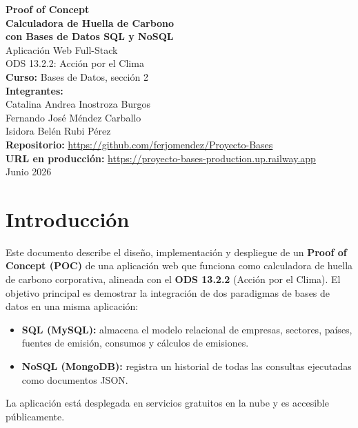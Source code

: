 \documentclass[12pt, a4paper]{article}
\begin{document}
\begin{titlepage}
\centering
\vspace*{3cm}
{\LARGE\bfseries Proof of Concept\\[0.3cm]
Calculadora de Huella de Carbono\\[0.2cm]
con Bases de Datos SQL y NoSQL}\\[1.5cm]
{\large Aplicación Web Full-Stack}\\[0.5cm]
{\large ODS 13.2.2: Acción por el Clima}\\[2.5cm]
{\large\bfseries Curso:} Bases de Datos, sección 2\\[0.6cm]
{\large\bfseries Integrantes:}\\[0.3cm]
{\large Catalina Andrea Inostroza Burgos}\\[0.15cm]
{\large Fernando José Méndez Carballo}\\[0.15cm]
{\large Isidora Belén Rubi Pérez}\\[0.6cm]
{\large\bfseries Repositorio:} \url{https://github.com/ferjomendez/Proyecto-Bases}\\[0.3cm]
{\large\bfseries URL en producción:} \url{https://proyecto-bases-production.up.railway.app}\\[2cm]
{\large Junio 2026}
\end{titlepage}
\tableofcontents
\newpage
\section{Introducción}
Este documento describe el diseño, implementación y despliegue de un \textbf{Proof of Concept (POC)} de una aplicación web que funciona como calculadora de huella de carbono corporativa, alineada con el \textbf{ODS 13.2.2} (Acción por el Clima).
El objetivo principal es demostrar la integración de dos paradigmas de bases de datos en una misma aplicación:
\begin{itemize}[nosep]
  \item \textbf{SQL (MySQL):} almacena el modelo relacional de empresas, sectores, países, fuentes de emisión, consumos y cálculos de emisiones.
  \item \textbf{NoSQL (MongoDB):} registra un historial de todas las consultas ejecutadas como documentos JSON.
\end{itemize}
La aplicación está desplegada en servicios gratuitos en la nube y es accesible públicamente.
\end{document}
